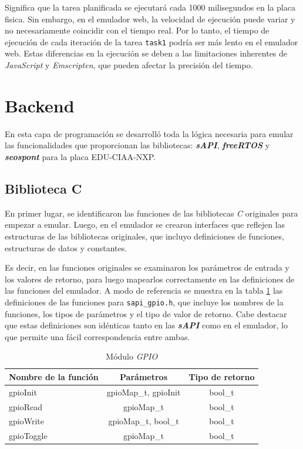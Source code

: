 Significa que la tarea  planificada se ejecutará cada 1000 milisegundos en la placa fisica. Sin embargo, en el emulador web, la velocidad de ejecución puede variar y no necesariamente coincidir con el tiempo real. Por lo tanto, el tiempo de ejecución de cada iteración de la tarea \texttt{task1} podría ser más lento en el emulador web. Estas diferencias en la ejecución se deben a las limitaciones inherentes de \textit{JavaScript} y \textit{Emscripten}, que pueden afectar la precisión del tiempo.

\section{Backend}

En esta capa de programación se desarrolló toda la lógica necesaria para emular las funcionalidades que proporcionan las bibliotecas: \textit{\textbf{sAPI}}, \textit{\textbf{freeRTOS}} y \textit{\textbf{seos\textunderscore pont}} para la placa EDU-CIAA-NXP.

\subsection{Biblioteca C}

En primer lugar, se identificaron las funciones de las bibliotecas \textit{C} originales para empezar a emular. Luego, en el emulador se crearon interfaces que reflejen las estructuras de las bibliotecas originales, que incluyo definiciones de funciones, estructuras de datos y constantes.

Es decir, en las funciones originales se examinaron los parámetros de entrada y los valores de retorno, para luego mapearlos correctamente en las definiciones de las funciones del emulador.  A modo de referencia se muestra en la tabla \ref{tab:gpioMap} las definiciones de las funciones para \texttt{sapi\_gpio.h}, que incluye los nombres de la funciones, los tipos de parámetros y el tipo de valor de retorno. Cabe destacar que estas definiciones son idénticas tanto en las \textit{\textbf{sAPI}} como en el emulador, lo que permite una fácil correspondencia entre ambas.

\begin{table}[h]
	\centering
	\caption[Módulo \textit{GPIO}]{Módulo \textit{GPIO}}
	\begin{tabular}{l c c}    
		\toprule
		\textbf{Nombre de la función} 	 & \textbf{Parámetros} 		& \textbf{Tipo de retorno}  \\
		\midrule
		gpioInit & gpioMap\_t, gpioInit				&  bool\_t \\		
		gpioRead	 & gpioMap\_t				&  bool\_t \\
		gpioWrite	 & gpioMap\_t, bool\_t				&  bool\_t \\
		gpioToggle	 & gpioMap\_t				&  bool\_t \\
		\bottomrule
		\hline
	\end{tabular}
	\label{tab:gpioMap}
\end{table}

